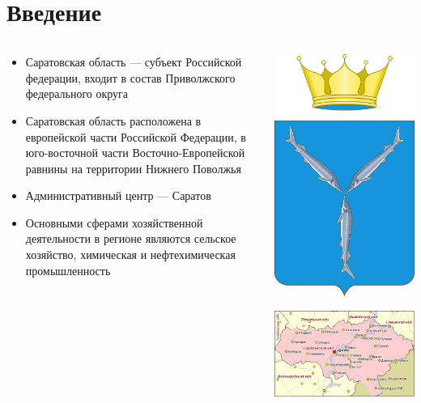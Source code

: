 
\section{Введение}
\begin{frame}{\insertsectionhead}

\begin{columns}[onlytextwidth,T]
  \begin{column}{.55\linewidth}
    \footnotesize
    \begin{itemize}
        \item Саратовская область\cite{govinfo} --- субъект Российской федерации, входит в состав Приволжского федерального округа
        \item Саратовская область расположена в европейской части Российской Федерации, в юго-восточной части 
        Восточно-Европейской равнины на территории Нижнего Поволжья
        \item Административный центр --- Саратов
        \item Основными сферами хозяйственной деятельности в регионе являются сельское хозяйство, химическая и нефтехимическая промышленность
    \end{itemize}
  \end{column}

  \begin{column}{.43\linewidth}
    \begin{center}
        \includegraphics[width=.2\textwidth]{assets/logo.png}
    \end{center}
    \includegraphics[width=\textwidth]{assets/saratov.png}
  \end{column}

\end{columns}
\end{frame}

